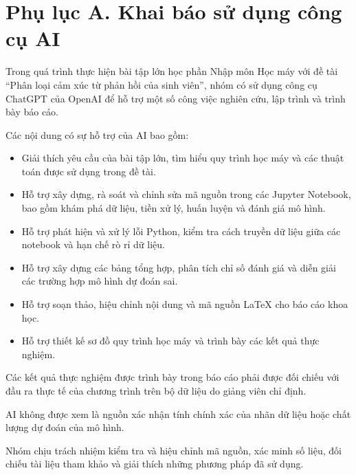 


\section*{Phụ lục A. Khai báo sử dụng công cụ AI}

Trong quá trình thực hiện bài tập lớn học phần
Nhập môn Học máy với đề tài
``Phân loại cảm xúc từ phản hồi của sinh viên'',
nhóm có sử dụng công cụ ChatGPT của OpenAI
để hỗ trợ một số công việc nghiên cứu,
lập trình và trình bày báo cáo.

Các nội dung có sự hỗ trợ của AI bao gồm:

\begin{itemize}

    \item Giải thích yêu cầu của bài tập lớn,
    tìm hiểu quy trình học máy và các thuật
    toán được sử dụng trong đề tài.

    \item Hỗ trợ xây dựng, rà soát và chỉnh sửa
    mã nguồn trong các Jupyter Notebook,
    bao gồm khám phá dữ liệu, tiền xử lý,
    huấn luyện và đánh giá mô hình.

    \item Hỗ trợ phát hiện và xử lý lỗi Python,
    kiểm tra cách truyền dữ liệu giữa các
    notebook và hạn chế rò rỉ dữ liệu.

    \item Hỗ trợ xây dựng các bảng tổng hợp,
    phân tích chỉ số đánh giá và diễn giải
    các trường hợp mô hình dự đoán sai.

    \item Hỗ trợ soạn thảo, hiệu chỉnh nội dung
    và mã nguồn LaTeX cho báo cáo khoa học.

    \item Hỗ trợ thiết kế sơ đồ quy trình học máy
    và trình bày các kết quả thực nghiệm.

\end{itemize}

Các kết quả thực nghiệm được trình bày
trong báo cáo phải được đối chiếu với
đầu ra thực tế của chương trình trên
bộ dữ liệu do giảng viên chỉ định.

AI không được xem là nguồn xác nhận
tính chính xác của nhãn dữ liệu hoặc
chất lượng dự đoán của mô hình.

Nhóm chịu trách nhiệm kiểm tra và
hiệu chỉnh mã nguồn, xác minh số liệu,
đối chiếu tài liệu tham khảo và
giải thích những phương pháp đã sử dụng.


